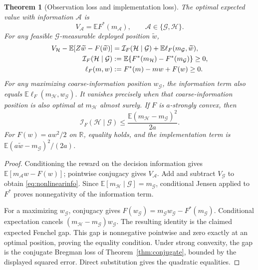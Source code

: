 \documentclass[11pt]{article}
\theoremstyle{plain}
\newtheorem{theorem}{Theorem}[section]
\theoremstyle{definition}
\theoremstyle{remark}
\newcommand{\E}{\mathbb E}
\newcommand{\R}{\mathbb R}
\begin{document}
\begin{theorem}[Observation loss and implementation loss]
\label{thm:nonlinearinformation}
The optimal expected value with information \(\mathcal A\) is
\[
 V_{\mathcal A}=\E F^*(m_{\mathcal A}),
 \qquad \mathcal A\in\{\mathcal G,\mathcal H\}.
\]
For any feasible \(\mathcal G\)-measurable deployed position
\(\widetilde w\),
\begin{align}
 V_{\mathcal H}-\E[Z\widetilde w-F(\widetilde w)]
 &=\mathcal I_F(\mathcal H\mid\mathcal G)
       +\E\ell_F(m_{\mathcal G},\widetilde w),\label{eq:nonlinearinfo}\\
 \mathcal I_F(\mathcal H\mid\mathcal G)
 &:=\E\{F^*(m_{\mathcal H})-F^*(m_{\mathcal G})\}\ge0,\notag\\
 \ell_F(m,w)&:=F^*(m)-mw+F(w)\ge0.\notag
\end{align}
For any maximizing coarse-information position
\(w_{\mathcal G}\), the information term also equals
\(\E\ell_F(m_{\mathcal H},w_{\mathcal G})\).
It vanishes precisely when that coarse-information position is
also optimal at \(m_{\mathcal H}\) almost surely.
If \(F\) is \(a\)-strongly convex, then
\begin{equation}\label{eq:informationquadraticupper}
 \mathcal I_F(\mathcal H\mid\mathcal G)
 \le \frac{\E(m_{\mathcal H}-m_{\mathcal G})^2}{2a}.
\end{equation}
For \(F(w)=aw^2/2\) on \(\R\), equality holds, and the
implementation term is
\(\E(a\widetilde w-m_{\mathcal G})^2/(2a)\).
\end{theorem}
\begin{proof}
Conditioning the reward on the decision information gives
\(\E[m_{\mathcal A}w-F(w)]\); pointwise conjugacy gives
\(V_{\mathcal A}\). Add and subtract \(V_{\mathcal G}\) to
obtain \eqref{eq:nonlinearinfo}. Since
\(\E[m_{\mathcal H}\mid\mathcal G]=m_{\mathcal G}\),
conditional Jensen applied to \(F^*\) proves nonnegativity
of the information term.

For a maximizing \(w_{\mathcal G}\), conjugacy gives
\(F(w_{\mathcal G})=m_{\mathcal G}w_{\mathcal G}
                     -F^*(m_{\mathcal G})\).
Conditional expectation cancels
\((m_{\mathcal H}-m_{\mathcal G})w_{\mathcal G}\).
The resulting identity is the claimed expected Fenchel gap.
This gap is nonnegative pointwise and zero exactly at an optimal
position, proving the equality condition.
Under strong convexity, the gap is the conjugate Bregman
loss of Theorem~\ref{thm:conjugate}, bounded by the displayed
squared error. Direct substitution gives the quadratic equalities.
\end{proof}
\end{document}
